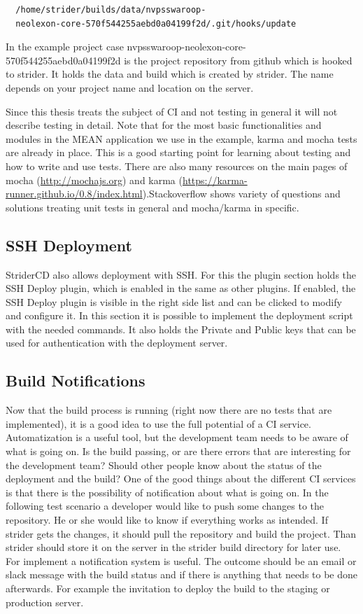 \begin{lstlisting}
  /home/strider/builds/data/nvpsswaroop-
  neolexon-core-570f544255aebd0a04199f2d/.git/hooks/update
\end{lstlisting}

In the example project case nvpsswaroop-neolexon-core-570f544255aebd0a04199f2d is the project repository from github which is hooked to strider.
It holds the data and build which is created by strider. The name depends on your project name and location on the server.

Since this thesis treats the subject of CI and not testing in general it will not describe testing in detail. Note that for the
most basic functionalities and modules in the MEAN application we use in the example, karma and mocha tests are already in place.
This is a good starting point for learning about testing and how to write and use tests. There are also many resources
on the main pages of mocha (\url{http://mochajs.org}) and karma (\url{https://karma-runner.github.io/0.8/index.html}).Stackoverflow
shows variety of questions and solutions treating unit tests in general and mocha/karma in specific.

\subsection{SSH Deployment}
\label{section:SSH Deployment}
StriderCD also allows deployment with SSH. For this the plugin section holds the SSH Deploy plugin, which is enabled in the same
as other plugins. If enabled, the SSH Deploy plugin is visible in the right side list and can be clicked to modify and configure it. In this
section it is possible to implement the deployment script with the needed commands. It also holds the Private and Public keys that can be used
for authentication with the deployment server.

\subsection{Build Notifications}
\label{section:Build Notifications}
Now that the build process is running (right now there are no tests that are implemented), it is a
good idea to use the full potential of a CI service. Automatization is a useful tool, but the development team needs to be aware of
what is going on. Is the build passing, or are there errors that are interesting for the development team? Should other people
know about the status of the deployment and the build? One of the good things about the different CI services is that there is the
possibility of notification about what is going on. In the following test scenario a developer would like to push some changes to the repository.
He or she would like to know if everything works as intended. If strider gets the changes, it should pull the repository and build the
project. Than strider should store it on the server in the strider build directory for later use. For implement a notification system is useful.
The outcome should be an email or slack message with the build status and if there is anything that needs to be done afterwards. For example
the invitation to deploy the build to the staging or production server.

